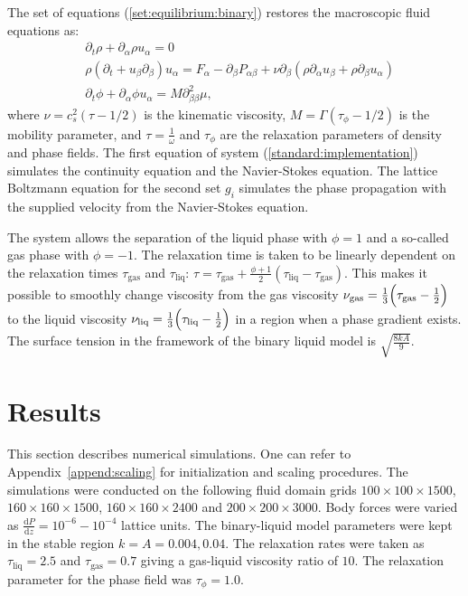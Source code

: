 \documentclass{article}
\begin{document}
The set of equations (\ref{set:equilibrium:binary}) restores the macroscopic
fluid equations as:
\begin{equation}
\label{full:navier:stokes}
\begin{aligned}
&\partial_t \rho+ \partial_{\alpha} \rho u_{\alpha}=0\\
&\rho\left(\partial_t+u_{\beta}\partial_{\beta}\right) u_{\alpha}=F_{\alpha}
-\partial_{\beta}P_{\alpha \beta} +
\nu\partial_{\beta}\left(\rho\partial_{\alpha}u_{\beta}+\rho\partial_{\beta} u_{\alpha}\right)\\
&\partial_t \phi + \partial_{\alpha} \phi u_{\alpha}=M \partial^2_{\beta\beta} \mu,
\end{aligned}
\end{equation}
where $\nu=c_s^2 (\tau-1/2)$ is the kinematic viscosity,
$M=\Gamma(\tau_{\phi}-1/2)$ is the mobility parameter, and $\tau=\frac{1}{\omega}$ and $\tau_{\phi}$
are the relaxation parameters of density and phase fields. The first equation of system
(\ref{standard:implementation}) simulates the continuity equation and the Navier-Stokes equation.
The lattice Boltzmann equation for the second set $g_i$ simulates the phase propagation with the
supplied velocity from the Navier-Stokes equation.

The system allows the separation of the liquid
phase with $\phi=1$ and a so-called gas phase with $\phi=-1$. The
relaxation time is taken to be linearly dependent on the relaxation
times $\tau_{\mathrm{gas}}$ and $\tau_{\mathrm{liq}}$:
$\tau=\tau_{\mathrm{gas}}+\frac{\phi+1}{2}(\tau_{\mathrm{liq}}-\tau_{\mathrm{gas}})$. This
makes it possible to smoothly change viscosity from the gas viscosity
$\nu_{\mathrm{gas}}=\frac{1}{3}\Bigl(\tau_{\mathrm{gas}}-\frac{1}{2}\Bigr)$ to the liquid viscosity
$\nu_{\mathrm{liq}}=\frac{1}{3}\Bigl(\tau_{\mathrm{liq}}-\frac{1}{2}\Bigr)$ in a region when a
phase gradient exists. The surface tension in the framework of the binary liquid model is $\sqrt{\frac{8 k
A}{9}}$.

\section{Results}
\label{sec:results}
This section describes numerical simulations. One can refer to Appendix~\ref{append:scaling} for
initialization and scaling procedures. The simulations were conducted on the following 
fluid domain grids $100 \times 100 \times 1500$, $160 \times 160 \times 1500$,
$160 \times 160 \times 2400$ and $200 \times 200 \times 3000$. Body forces were varied as
$\frac{\mathrm{d}P}{\mathrm{d}z}=10^{-6}-10^{-4}$ lattice units. The binary-liquid model parameters
were kept in
the stable region $k=A=0.004,0.04$. The relaxation rates were taken as $\tau_{\mathrm{liq}}=2.5$
and $\tau_{\mathrm{gas}}=0.7$ giving a gas-liquid viscosity ratio of $10$. The relaxation
parameter for the phase field was $\tau_{\phi}=1.0$.
\end{document}
